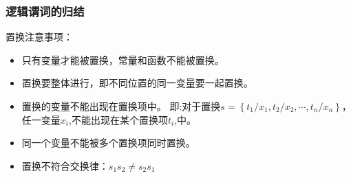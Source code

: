 \subsubsection{逻辑谓词的归结}
\begin{note}
    置换注意事项：

    \begin{itemize}
        \item 只有变量才能被置换，常量和函数不能被置换。
        \item 置换要整体进行，即不同位置的同一变量要一起置换。
        \item \textcolor{main1}{置换的变量不能出现在置换项中。} 即:对于置换$s = \left\{ t_1/x_1,t_2/x_2,\cdots,t_n/x_n \right\}$，任一变量$x_i$,不能出现在某个置换项$t_i$,中。
        \item 同一个变量不能被多个置换项同时置换。
        \item 置换不符合交换律：$s_1s_2\neq s_2s_1$
    \end{itemize}
\end{note}
